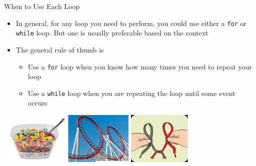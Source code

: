 {}\documentclass[letterpaper,
compress,
xcolor=x11names,
]{beamer}
\begin{document}

\begin{frame}{When to Use Each Loop}
	\footnotesize
	\begin{itemize}
		\item In general, for any loop you need to perform, you could use either a \texttt{for} or \texttt{while} loop. But one is usually preferable based on the context
		\item The general rule of thumb is
		\begin{itemize}
			\item Use a \texttt{for} loop when you know how many times you need to repeat your loop 
			\item Use a \texttt{while} loop when you are repeating the loop until some event occurs
		\end{itemize}
	\end{itemize}
	\begin{center}
		\includegraphics[height = 2.5cm]{Cereal_loops.jpg}
		\includegraphics[height = 2.5cm]{Coaster_loops.jpg}
		\includegraphics[height = 2.5cm]{shoe_loops.png}
	\end{center}
\end{frame}

\end{document}
